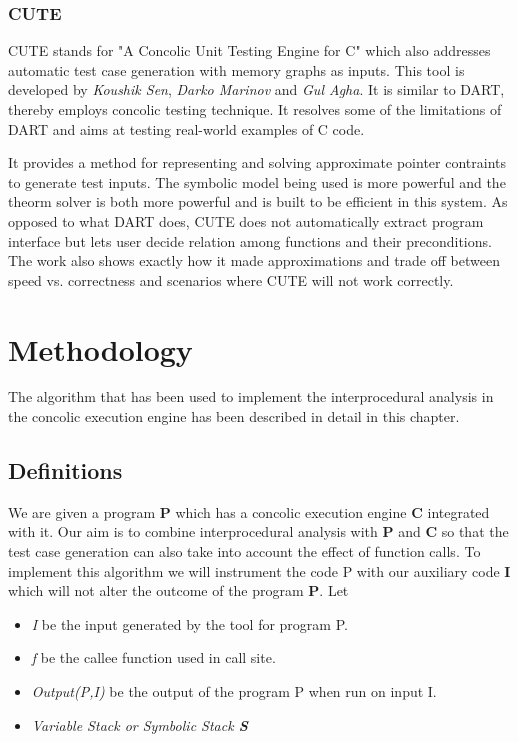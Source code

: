 \documentclass[12pt,oneside]{book}
\begin{document}
\newpage


\subsection{CUTE}
CUTE stands for "A Concolic Unit Testing Engine for C" which also addresses automatic test case generation with memory graphs as inputs. This tool is developed by \textit{Koushik Sen}, \textit{Darko Marinov} and \textit{Gul Agha}. It is similar to DART, thereby employs concolic testing technique. It resolves some of the limitations of DART and aims at testing real-world examples of C code.

It provides a method for representing and solving approximate pointer contraints to generate test inputs. The symbolic model being used is more powerful and the theorm solver is both more powerful and is built to be efficient in this system. As opposed to what DART does, CUTE does not automatically extract program interface but lets user decide relation among functions and their preconditions. The work also shows exactly how it made approximations and trade off between speed vs. correctness and scenarios where CUTE will not work correctly.






\newpage


\chapter{Methodology}
The algorithm that has been used to implement the interprocedural analysis in the concolic execution engine has been described in detail in this chapter.

\section{Definitions}

We are given a program \textbf{P} which has a concolic execution engine \textbf{C} integrated with it. Our aim is to combine interprocedural analysis with \textbf{P} and \textbf{C} so that the test case generation can also take into account the effect of function calls. To implement this algorithm we will instrument the code P with our auxiliary code \textbf{I} which will not alter the outcome of the program \textbf{P}. Let 

\begin{itemize}
 \item \textit{I} be the input generated by the tool for program P.
  \item \textit{f} be the callee function used in call site.
 \item \textit{Output(P,I)} be the output of the program P when run on input I. 
 \item \textit{Variable Stack or Symbolic Stack \textbf{S}}  
\end{itemize}
\end{document}
